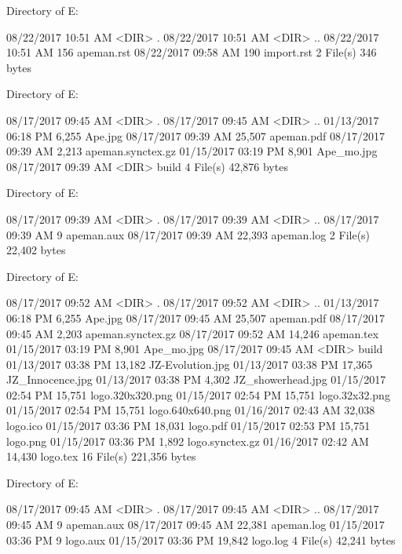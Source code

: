  Directory of E:\Python\apeman\docs{}

08/22/2017  10:51 AM    <DIR>          .
08/22/2017  10:51 AM    <DIR>          ..
08/22/2017  10:51 AM               156 apeman.rst
08/22/2017  09:58 AM               190 import.rst
               2 File(s)            346 bytes

 Directory of E:\Python\apeman\docs\Apeman

08/17/2017  09:45 AM    <DIR>          .
08/17/2017  09:45 AM    <DIR>          ..
01/13/2017  06:18 PM             6,255 Ape.jpg
08/17/2017  09:39 AM            25,507 apeman.pdf
08/17/2017  09:39 AM             2,213 apeman.synctex.gz
01/15/2017  03:19 PM             8,901 Ape_mo.jpg
08/17/2017  09:39 AM    <DIR>          build
               4 File(s)         42,876 bytes

 Directory of E:\Python\apeman\docs\Apeman\build

08/17/2017  09:39 AM    <DIR>          .
08/17/2017  09:39 AM    <DIR>          ..
08/17/2017  09:39 AM                 9 apeman.aux
08/17/2017  09:39 AM            22,393 apeman.log
               2 File(s)         22,402 bytes

 Directory of E:\Python\apeman\docs\branding

08/17/2017  09:52 AM    <DIR>          .
08/17/2017  09:52 AM    <DIR>          ..
01/13/2017  06:18 PM             6,255 Ape.jpg
08/17/2017  09:45 AM            25,507 apeman.pdf
08/17/2017  09:45 AM             2,203 apeman.synctex.gz
08/17/2017  09:52 AM            14,246 apeman.tex
01/15/2017  03:19 PM             8,901 Ape_mo.jpg
08/17/2017  09:45 AM    <DIR>          build
01/13/2017  03:38 PM            13,182 JZ-Evolution.jpg
01/13/2017  03:38 PM            17,365 JZ_Innocence.jpg
01/13/2017  03:38 PM             4,302 JZ_showerhead.jpg
01/15/2017  02:54 PM            15,751 logo.320x320.png
01/15/2017  02:54 PM            15,751 logo.32x32.png
01/15/2017  02:54 PM            15,751 logo.640x640.png
01/16/2017  02:43 AM            32,038 logo.ico
01/15/2017  03:36 PM            18,031 logo.pdf
01/15/2017  02:53 PM            15,751 logo.png
01/15/2017  03:36 PM             1,892 logo.synctex.gz
01/16/2017  02:42 AM            14,430 logo.tex
              16 File(s)        221,356 bytes

 Directory of E:\Python\apeman\docs\branding\build

08/17/2017  09:45 AM    <DIR>          .
08/17/2017  09:45 AM    <DIR>          ..
08/17/2017  09:45 AM                 9 apeman.aux
08/17/2017  09:45 AM            22,381 apeman.log
01/15/2017  03:36 PM                 9 logo.aux
01/15/2017  03:36 PM            19,842 logo.log
               4 File(s)         42,241 bytes

